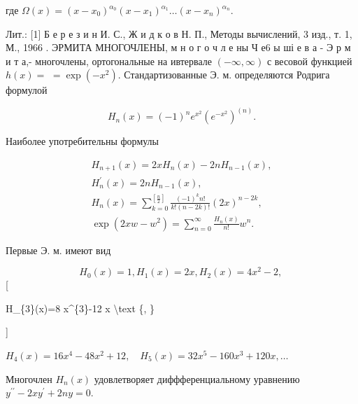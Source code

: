 \documentclass[10pt]{article}
\begin{document}
где $\Omega(x)=\left(x-x_{0}\right)^{\alpha_{0}}\left(x-x_{1}\right)^{\alpha_{1}} \ldots\left(x-x_{n}\right)^{\alpha_{n}}$.



Лит.: [1] Б е р е з и н И. С., Ж и д к о в Н. П., Методы вычислений, 3 изд., т. 1, М., 1966 . ЭРМИТА МНОГОЧЛЕНЫ, м н о г о ч л е ны Ч е6 ы ші е в а - Э р м и т а,- многочлены, ортогональные на ивтервале $(-\infty, \infty)$ с весовой функцией $h(x)=$ $=\exp \left(-x^{2}\right)$. Стандартизованные Э. м. определяются Родрига формулой



\[

H_{n}(x)=(-1)^{n} e^{x^{2}}\left(e^{-x^{2}}\right)^{(n)} .

\]



Наиболее употребительны формулы



\[

\begin{gathered}

H_{n+1}(x)=2 x H_{n}(x)-2 n H_{n-1}(x), \\

H_{n}^{\prime}(x)=2 n H_{n-1}(x), \\

H_{n}(x)=\sum_{k=0}^{\left[\frac{n}{2}\right]} \frac{(-1)^{k} n !}{k !(n-2 k) !}(2 x)^{n-2 k}, \\

\exp \left(2 x w-w^{2}\right)=\sum_{n=0}^{\infty} \frac{H_{n}(x)}{n !} w^{n} .

\end{gathered}

\]



Первые Э. м. имеют вид



\[

H_{0}(x)=1, H_{1}(x)=2 x, H_{2}(x)=4 x^{2}-2 \text {, }

\][



H\_\{3\}(x)=8 x\^{}\{3\}-12 x \textbackslash text \{, \}

]



$H_{4}(x)=16 x^{4}-48 x^{2}+12, \quad H_{5}(x)=32 x^{5}-160 x^{3}+120 x, \ldots$



Многочлен $H_{n}(x)$ удовлетворяет диффференциальному уравнению $y^{\prime \prime}-2 x y^{\prime}+2 n y=0$.
\end{document}
